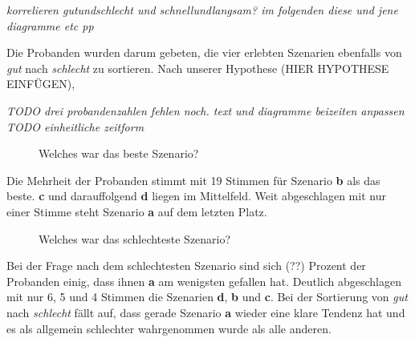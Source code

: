 \documentclass{Paper}
\begin{document}
	
	
	
\textit{korrelieren gutundschlecht und schnellundlangsam? im folgenden diese und jene diagramme etc pp}


	
	
	Die Probanden wurden darum gebeten, die vier erlebten Szenarien ebenfalls von \textit{gut} nach \textit{schlecht} zu sortieren. Nach unserer Hypothese (HIER HYPOTHESE EINFÜGEN),  


\textit{TODO drei probandenzahlen fehlen noch. text und diagramme beizeiten anpassen\\
TODO einheitliche zeitform}

	\begin{figure}[ht]
\caption{Welches war das beste Szenario?}
\end{figure}

Die Mehrheit der Probanden stimmt mit 19 Stimmen für Szenario \textbf{b} als das beste. \textbf{c} und darauffolgend \textbf{d} liegen im Mittelfeld. Weit abgeschlagen mit nur einer Stimme steht Szenario \textbf{a} auf dem letzten Platz.
	
	
	\begin{figure}[ht]
\caption{Welches war das schlechteste Szenario?}
\end{figure}
	

Bei der Frage nach dem schlechtesten Szenario sind sich (??) Prozent der Probanden einig, dass ihnen \textbf{a} am wenigsten gefallen hat. Deutlich abgeschlagen mit nur 6, 5 und 4 Stimmen die Szenarien \textbf{d}, \textbf{b} und \textbf{c}. 
Bei der Sortierung von \textit{gut} nach \textit{schlecht} fällt auf, dass gerade Szenario \textbf{a} wieder eine klare Tendenz hat und es als allgemein schlechter wahrgenommen wurde als alle anderen. 
\end{document}
